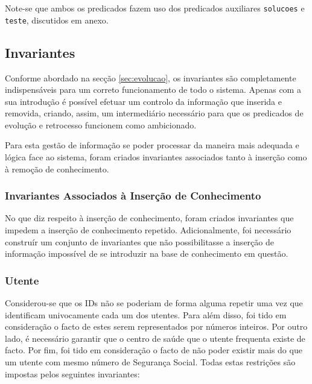 \documentclass[a4paper, 11pt]{article}
\begin{document}
Note-se que ambos os predicados fazem uso dos predicados auxiliares \texttt{solucoes} e \texttt{teste}, discutidos em anexo.

\subsection{Invariantes}

Conforme abordado na secção \ref{sec:evolucao}, os invariantes são completamente indispensáveis para um correto funcionamento
de todo o sistema. Apenas com a sua introdução é possível efetuar um controlo da informação que inserida e removida, criando,
assim, um intermediário necessário para que os predicados de evolução e retrocesso funcionem como ambicionado.

Para esta gestão de informação se poder processar da maneira mais adequada e lógica face ao sistema, foram criados invariantes
associados tanto à inserção como à remoção de conhecimento.

\subsubsection{Invariantes Associados à Inserção de Conhecimento}

No que diz respeito à inserção de conhecimento, foram criados invariantes que impedem a inserção de conhecimento repetido.
Adicionalmente, foi necessário construír um conjunto de invariantes que não possibilitasse a inserção de informação impossível
de se introduzir na base de conhecimento em questão.

\subsubsection*{Utente}

Considerou-se que os IDs não se poderiam de forma alguma repetir uma vez que identificam univocamente cada um dos utentes.
Para além disso, foi tido em consideração o facto de estes serem representados por números inteiros. Por outro lado, é
necessário garantir que o centro de saúde que o utente frequenta existe de facto. Por fim, foi tido em consideração o facto
de não poder existir mais do que um utente com mesmo número de Segurança Social. Todas estas restrições são impostas
pelos seguintes invariantes:

\
\end{document}
